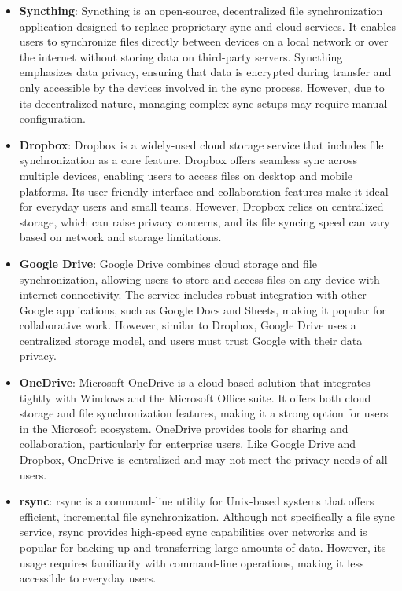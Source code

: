 \documentclass{article}
\begin{document}
    \begin{itemize}
      \item \textbf{Syncthing}: Syncthing is an open-source, decentralized file synchronization application designed to replace proprietary sync and cloud services. It enables users to synchronize files directly between devices on a local network or over the internet without storing data on third-party servers. Syncthing emphasizes data privacy, ensuring that data is encrypted during transfer and only accessible by the devices involved in the sync process. However, due to its decentralized nature, managing complex sync setups may require manual configuration.

      \item \textbf{Dropbox}: Dropbox is a widely-used cloud storage service that includes file synchronization as a core feature. Dropbox offers seamless sync across multiple devices, enabling users to access files on desktop and mobile platforms. Its user-friendly interface and collaboration features make it ideal for everyday users and small teams. However, Dropbox relies on centralized storage, which can raise privacy concerns, and its file syncing speed can vary based on network and storage limitations.

      \item \textbf{Google Drive}: Google Drive combines cloud storage and file synchronization, allowing users to store and access files on any device with internet connectivity. The service includes robust integration with other Google applications, such as Google Docs and Sheets, making it popular for collaborative work. However, similar to Dropbox, Google Drive uses a centralized storage model, and users must trust Google with their data privacy.

      \item \textbf{OneDrive}: Microsoft OneDrive is a cloud-based solution that integrates tightly with Windows and the Microsoft Office suite. It offers both cloud storage and file synchronization features, making it a strong option for users in the Microsoft ecosystem. OneDrive provides tools for sharing and collaboration, particularly for enterprise users. Like Google Drive and Dropbox, OneDrive is centralized and may not meet the privacy needs of all users.

      \item \textbf{rsync}: rsync is a command-line utility for Unix-based systems that offers efficient, incremental file synchronization. Although not specifically a file sync service, rsync provides high-speed sync capabilities over networks and is popular for backing up and transferring large amounts of data. However, its usage requires familiarity with command-line operations, making it less accessible to everyday users.


\end{itemize}
\end{document}
